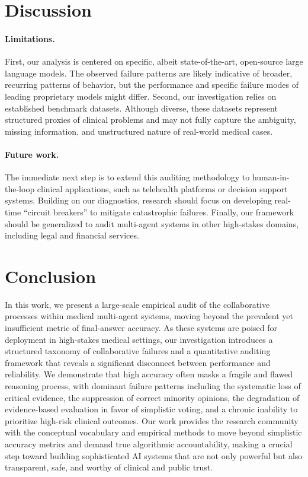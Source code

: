\documentclass{article}
\begin{document}
\section{Discussion}

\paragraph{Limitations.}
First, our analysis is centered on specific, albeit state-of-the-art, open-source large language models. The observed failure patterns are likely indicative of broader, recurring patterns of behavior, but the performance and specific failure modes of leading proprietary models might differ. Second, our investigation relies on established benchmark datasets. Although diverse, these datasets represent structured proxies of clinical problems and may not fully capture the ambiguity, missing information, and unstructured nature of real-world medical cases.

\paragraph{Future work.}
The immediate next step is to extend this auditing methodology to human-in-the-loop clinical applications, such as telehealth platforms or decision support systems. Building on our diagnostics, research should focus on developing real-time ``circuit breakers'' to mitigate catastrophic failures. Finally, our framework should be generalized to audit multi-agent systems in other high-stakes domains, including legal and financial services.

\section{Conclusion}

In this work, we present a large-scale empirical audit of the collaborative processes within medical multi-agent systems, moving beyond the prevalent yet insufficient metric of final-answer accuracy. As these systems are poised for deployment in high-stakes medical settings, our investigation introduces a structured taxonomy of collaborative failures and a quantitative auditing framework that reveals a significant disconnect between performance and reliability. We demonstrate that high accuracy often masks a fragile and flawed reasoning process, with dominant failure patterns including the systematic loss of critical evidence, the suppression of correct minority opinions, the degradation of evidence-based evaluation in favor of simplistic voting, and a chronic inability to prioritize high-risk clinical outcomes. Our work provides the research community with the conceptual vocabulary and empirical methods to move beyond simplistic accuracy metrics and demand true algorithmic accountability, making a crucial step toward building sophisticated AI systems that are not only powerful but also transparent, safe, and worthy of clinical and public trust.
\end{document}
